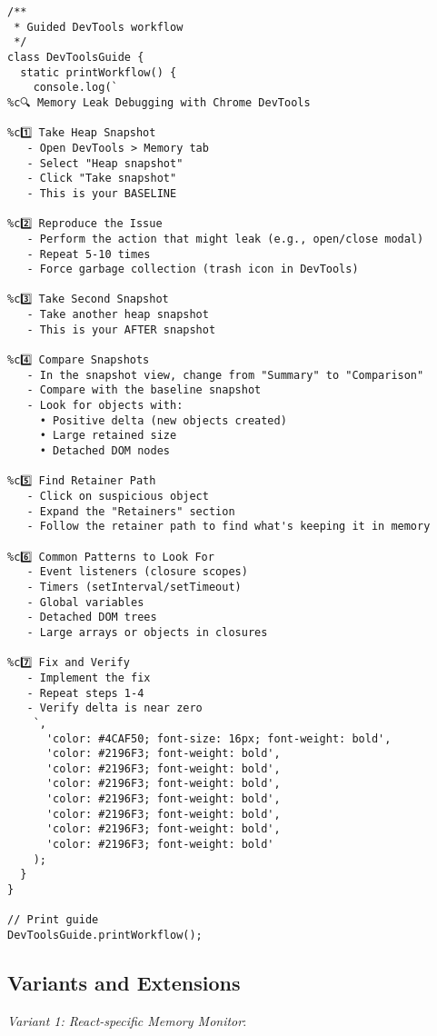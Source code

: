 \documentclass[11pt]{article}
\begin{document}
\begin{verbatim}
/**
 * Guided DevTools workflow
 */
class DevToolsGuide {
  static printWorkflow() {
    console.log(`
%c🔍 Memory Leak Debugging with Chrome DevTools

%c1️⃣ Take Heap Snapshot
   - Open DevTools > Memory tab
   - Select "Heap snapshot"
   - Click "Take snapshot"
   - This is your BASELINE

%c2️⃣ Reproduce the Issue
   - Perform the action that might leak (e.g., open/close modal)
   - Repeat 5-10 times
   - Force garbage collection (trash icon in DevTools)

%c3️⃣ Take Second Snapshot
   - Take another heap snapshot
   - This is your AFTER snapshot

%c4️⃣ Compare Snapshots
   - In the snapshot view, change from "Summary" to "Comparison"
   - Compare with the baseline snapshot
   - Look for objects with:
     • Positive delta (new objects created)
     • Large retained size
     • Detached DOM nodes

%c5️⃣ Find Retainer Path
   - Click on suspicious object
   - Expand the "Retainers" section
   - Follow the retainer path to find what's keeping it in memory

%c6️⃣ Common Patterns to Look For
   - Event listeners (closure scopes)
   - Timers (setInterval/setTimeout)
   - Global variables
   - Detached DOM trees
   - Large arrays or objects in closures

%c7️⃣ Fix and Verify
   - Implement the fix
   - Repeat steps 1-4
   - Verify delta is near zero
    `,
      'color: #4CAF50; font-size: 16px; font-weight: bold',
      'color: #2196F3; font-weight: bold',
      'color: #2196F3; font-weight: bold',
      'color: #2196F3; font-weight: bold',
      'color: #2196F3; font-weight: bold',
      'color: #2196F3; font-weight: bold',
      'color: #2196F3; font-weight: bold',
      'color: #2196F3; font-weight: bold'
    );
  }
}

// Print guide
DevToolsGuide.printWorkflow();
\end{verbatim}
\subsection{Variants and Extensions}
\label{sec:orga3a1327}

\emph{Variant 1: React-specific Memory Monitor}:
\end{document}
